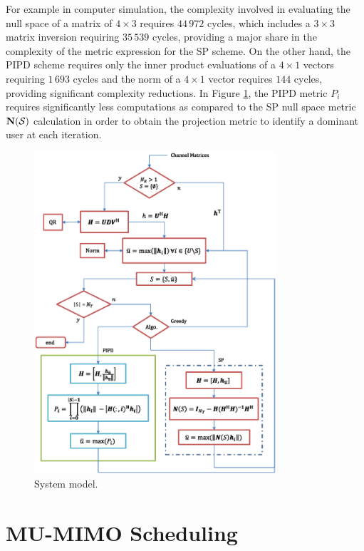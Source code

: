 \documentclass[conference]{./../../IEEE/IEEEtran}
\begin{document}
For example in computer simulation, the complexity involved in evaluating the null space of a matrix of $4 \times 3$ requires $44 \, 972$ cycles, which includes a $3 \times 3$ matrix inversion requiring $35 \, 539$ cycles, providing a major share in the complexity of the metric expression for the SP scheme. On the other hand, the PIPD scheme requires only the inner product evaluations of a $4 \times 1$ vectors requiring $1 \, 693$ cycles and the norm of a $4 \times 1$ vector requires $144$ cycles, providing significant complexity reductions. In Figure \ref{kuva:scheduler_block_diag}, the PIPD metric $P_i$ requires significantly less computations as compared to the SP null space metric $\mathbf{N}(\mathcal{S})$ calculation in order to obtain the projection metric to identify a dominant user at each iteration.

\begin{figure}[htb]
\centering
\includegraphics[width=9.0cm, angle=0]{scheduler_figure_updated2.eps}
\caption{System model.}
\label{kuva:scheduler_block_diag}
\end{figure}

\section{MU-MIMO Scheduling}
\label{sec:perf_scheduling}
\end{document}

